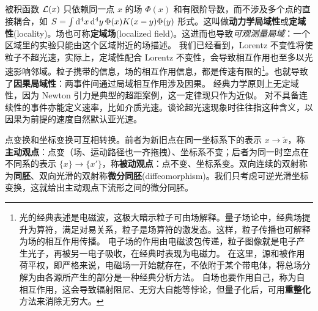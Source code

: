 被积函数 $\mathcal{L}(x)$ 只依赖同一点 $x$ 的场 $\Phi(x)$ 和有限阶导数，而不涉及多个点的直接耦合，如 $S=\int\dd[4]{x}\dd[4]{y}\Phi(x)K(x-y)\Phi(y)$ 形式。这叫做\textbf{动力学局域性}或\textbf{定域性}(locality)。场也可称\textbf{定域场}(localized field)。这进而也导致\textit{可观测量局域}：一个区域里的实验只能由这个区域附近的场描述。
我们已经看到，Lorentz 不变性将使粒子不超光速，实际上，定域性配合 Lorentz 不变性，会导致相互作用也至多以光速影响邻域。粒子携带的信息，场的相互作用信息，都是传速有限的\footnote{光的经典表述是电磁波，这极大暗示粒子可由场解释。量子场论中，经典场提升为算符，满足对易关系，粒子是场算符的激发态。这样，粒子传播也可解释为场的相互作用传播。
电子场的作用由电磁波包传递，粒子图像就是电子产生光子，再被另一电子吸收，在经典时表现为电磁力。
在这里，源和被作用荷平权，即严格来说，电磁场一开始就存在，不依附于某个带电体，将总场分解为由各源所产生的部分是一种经典分析方法。
自场也要作用自己，称为自相互作用，这会导致辐射阻尼、无穷大自能等悖论，但量子化后，可用\textbf{重整化}方法来消除无穷大。}。也就导致了\textbf{因果局域性}：两事件间通过局域相互作用涉及因果。
经典力学原则上无定域性，因为 Newton 引力是典型的超距案例，这一定律现只作为近似。
对不具备连续性的事件亦能定义速率，比如介质光速。谈论超光速现象时往往指这种含义，以因果为前提的速度自然默认亚光速。

点变换和坐标变换可互相转换。前者为新旧点在同一坐标系下的表示 $x\to\tilde x$，称\textbf{主动观点}：点变（场、运动路径也一齐拖拽）、坐标系不变；后者为同一时空点在不同系的表示 $\{x\}\to\{x'\}$，称\textbf{被动观点}：点不变、坐标系变。双向连续的双射称为\textbf{同胚}、双向光滑的双射称\textbf{微分同胚}(diffeomorphism)。我们只考虑可逆光滑坐标变换，这就给出主动观点下流形之间的微分同胚。

